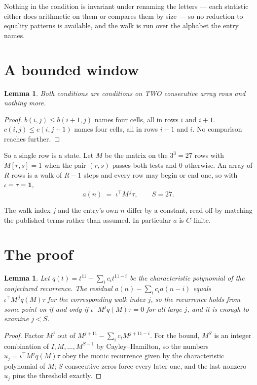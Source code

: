 \documentclass[11pt,a4paper]{article}
\theoremstyle{plain}
\newtheorem{lemma}[theorem]{Lemma}
\theoremstyle{definition}
\begin{document}
Nothing in the condition is invariant under renaming the letters --- each statistic either does
arithmetic on them or compares them by size --- so no reduction to equality patterns is
available, and the walk is run over the alphabet the entry names.

\section{A bounded window}

\begin{lemma}\label{lem:win}
Both conditions are conditions on TWO consecutive array rows and nothing more.
\end{lemma}

\begin{proof}
$b(i,j)\le b(i{+}1,j)$ names four cells, all in rows $i$ and $i+1$. $c(i,j)\le c(i,j{+}1)$
names four cells, all in rows $i-1$ and $i$. No comparison reaches further.
\end{proof}

So a single row is a state. Let $M$ be the matrix on the $3^{3}=27$ rows with
$M[r,s]=1$ when the pair $(r,s)$ passes both tests and $0$ otherwise. An array of $R$ rows is a
walk of $R-1$ steps and every row may begin or end one, so with $\iota=\tau=\mathbf{1}$,
\[
a(n)\;=\;\iota^{\!\top}M^{\,j}\tau ,\qquad S=27.
\]

The walk index $j$ and the entry's own $n$ differ by a constant, read off by matching the
published terms rather than assumed. In particular $a$ is $C$-finite.

\section{The proof}

\begin{lemma}\label{lem:crit}
Let $q(t)=t^{11}-\sum_i c_it^{11-i}$ be the characteristic polynomial of the
conjectured recurrence. The residual $a(n)-\sum_ic_ia(n-i)$ equals
$\iota^{\!\top}M^{\,j}q(M)\tau$ for the corresponding walk index $j$, so the recurrence
holds from some point on if and only if $\iota^{\!\top}M^{j}q(M)\tau=0$ for all large $j$,
and it is enough to examine $j<S$.
\end{lemma}

\begin{proof}
Factor $M^{j}$ out of $M^{j+11}-\sum_ic_iM^{j+11-i}$. For the bound, $M^{S}$
is an integer combination of $I,M,\dots,M^{S-1}$ by Cayley--Hamilton, so the numbers
$u_j=\iota^{\!\top}M^{j}q(M)\tau$ obey the monic recurrence given by the characteristic
polynomial of $M$; $S$ consecutive zeros force every later one, and the last nonzero $u_j$
pins the threshold exactly.
\end{proof}
\end{document}
